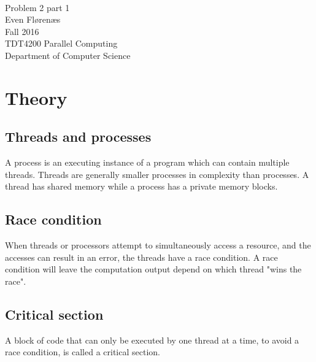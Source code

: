 \documentclass[12pt]{article}
\begin{document}
\thispagestyle{empty}
\mbox{}\\[6pc]
\begin{center}
\Huge{Problem 2 part 1}\\[2pc]

\Large{Even Flørenæs}\\[1pc]
\Large{Fall 2016}\\[2pc]

TDT4200 Parallel Computing\\
Department of Computer Science
\end{center}
\vfill

\newpage
\tableofcontents
\newpage
\section{Theory}
\subsection{Threads and processes}
A process is an executing instance of a program which can contain multiple threads. Threads are generally smaller processes in complexity than processes. A thread has shared memory while a process has a private memory blocks.
\subsection{Race condition}
When threads or processors attempt to simultaneously  access a resource, and the accesses can result in an error, the threads have a race condition. A race condition will leave the computation output depend on which thread "wins the race".
\subsection{Critical section}
A block of code that can only be executed by one thread at a time, to avoid a race condition, is called a critical section.
\end{document}
